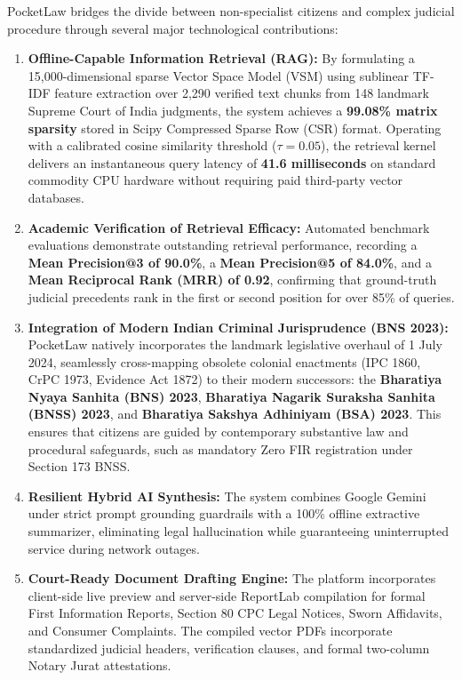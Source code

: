 PocketLaw bridges the divide between non-specialist citizens and complex judicial procedure through several major technological contributions:
\begin{enumerate}
    \item \textbf{Offline-Capable Information Retrieval (RAG):}
    By formulating a 15,000-dimensional sparse Vector Space Model (VSM) using sublinear TF-IDF feature extraction over 2,290 verified text chunks from 148 landmark Supreme Court of India judgments, the system achieves a \textbf{99.08\% matrix sparsity} stored in Scipy Compressed Sparse Row (CSR) format. Operating with a calibrated cosine similarity threshold ($\tau = 0.05$), the retrieval kernel delivers an instantaneous query latency of \textbf{41.6 milliseconds} on standard commodity CPU hardware without requiring paid third-party vector databases.
    
    \item \textbf{Academic Verification of Retrieval Efficacy:}
    Automated benchmark evaluations demonstrate outstanding retrieval performance, recording a \textbf{Mean Precision@3 of 90.0\%}, a \textbf{Mean Precision@5 of 84.0\%}, and a \textbf{Mean Reciprocal Rank (MRR) of 0.92}, confirming that ground-truth judicial precedents rank in the first or second position for over 85\% of queries.
    
    \item \textbf{Integration of Modern Indian Criminal Jurisprudence (BNS 2023):}
    PocketLaw natively incorporates the landmark legislative overhaul of 1 July 2024, seamlessly cross-mapping obsolete colonial enactments (IPC 1860, CrPC 1973, Evidence Act 1872) to their modern successors: the \textbf{Bharatiya Nyaya Sanhita (BNS) 2023}, \textbf{Bharatiya Nagarik Suraksha Sanhita (BNSS) 2023}, and \textbf{Bharatiya Sakshya Adhiniyam (BSA) 2023}. This ensures that citizens are guided by contemporary substantive law and procedural safeguards, such as mandatory Zero FIR registration under Section 173 BNSS.
    
    \item \textbf{Resilient Hybrid AI Synthesis:}
    The system combines Google Gemini under strict prompt grounding guardrails with a 100\% offline extractive summarizer, eliminating legal hallucination while guaranteeing uninterrupted service during network outages.
    
    \item \textbf{Court-Ready Document Drafting Engine:}
    The platform incorporates client-side live preview and server-side ReportLab compilation for formal First Information Reports, Section 80 CPC Legal Notices, Sworn Affidavits, and Consumer Complaints. The compiled vector PDFs incorporate standardized judicial headers, verification clauses, and formal two-column Notary Jurat attestations.
    

\end{enumerate}
